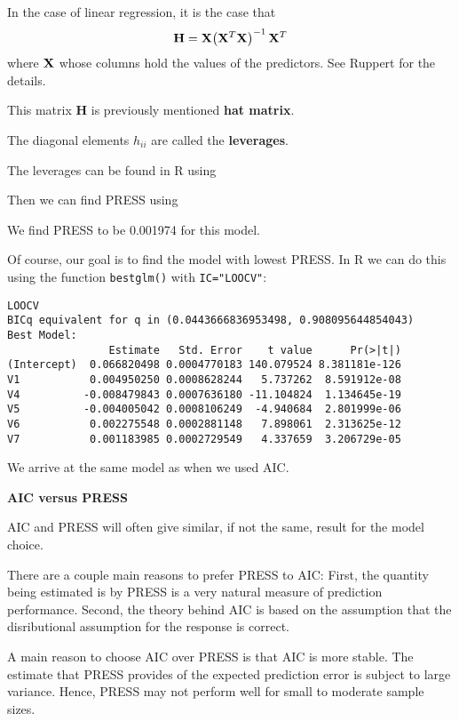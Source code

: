 \documentclass{report}
\begin{document}
In the case of linear regression, it is the case that
\[
   {\bf H} = {\bf X} \!\left({\bf X}^T{\bf X}\right)^{-1} {\bf X}^T
\]
where ${\bf X}$ whose columns hold the values of the predictors.
See Ruppert for the details.

This matrix {\bf H} is previously mentioned {\bf hat matrix}.

The diagonal elements $h_{ii}$ are called the {\bf leverages}.

\newpage

The leverages can be found in R using


Then we can find PRESS using


We find PRESS to be 0.001974 for this model.

Of course, our goal is to find the model with lowest PRESS.
In R we can do this using the function {\tt bestglm()} with
{\tt IC="LOOCV"}:


\normalsize
\begin{verbatim}
LOOCV
BICq equivalent for q in (0.0443666836953498, 0.908095644854043)
Best Model:
                Estimate   Std. Error    t value      Pr(>|t|)
(Intercept)  0.066820498 0.0004770183 140.079524 8.381181e-126
V1           0.004950250 0.0008628244   5.737262  8.591912e-08
V4          -0.008479843 0.0007636180 -11.104824  1.134645e-19
V5          -0.004005042 0.0008106249  -4.940684  2.801999e-06
V6           0.002275548 0.0002881148   7.898061  2.313625e-12
V7           0.001183985 0.0002729549   4.337659  3.206729e-05
\end{verbatim}
\Large

We arrive at the same model as when we used AIC.

\newpage

{\bf AIC versus PRESS}

AIC and PRESS will often give similar, if not the same, result for the
model choice.

There are a couple main reasons to prefer
PRESS to AIC: First, the quantity being estimated is by PRESS
is a very natural measure of prediction performance. Second, the
theory behind AIC is based on the assumption that the disributional
assumption for the response is correct.

A main reason to choose AIC over PRESS is that AIC is more
stable. 
The estimate
that PRESS provides of the expected prediction error is subject
to large variance. Hence, PRESS may
not perform well for small to moderate sample sizes.
\end{document}
